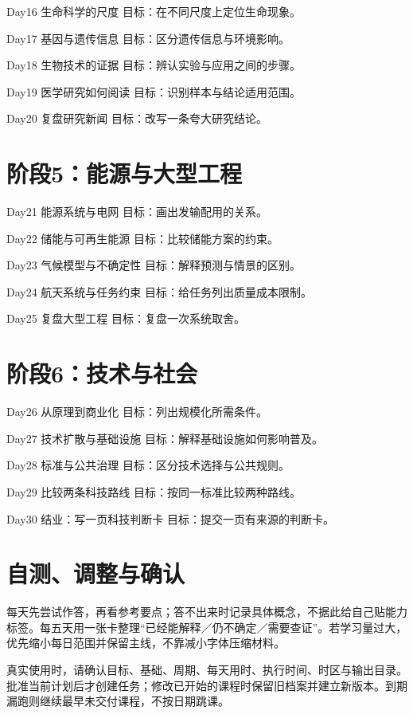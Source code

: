 \documentclass[11pt]{article}
\newcommand{\Needspace}[1]{\par\ifdim\dimexpr\pagegoal-\pagetotal\relax<#1\relax\newpage\fi}
\begin{document}
Day16  生命科学的尺度
目标：在不同尺度上定位生命现象。

Day17  基因与遗传信息
目标：区分遗传信息与环境影响。

Day18  生物技术的证据
目标：辨认实验与应用之间的步骤。

Day19  医学研究如何阅读
目标：识别样本与结论适用范围。

Day20  复盘研究新闻
目标：改写一条夸大研究结论。

\Needspace{5\baselineskip}\section*{阶段5：能源与大型工程}

Day21  能源系统与电网
目标：画出发输配用的关系。

Day22  储能与可再生能源
目标：比较储能方案的约束。

Day23  气候模型与不确定性
目标：解释预测与情景的区别。

Day24  航天系统与任务约束
目标：给任务列出质量成本限制。

Day25  复盘大型工程
目标：复盘一次系统取舍。

\Needspace{5\baselineskip}\section*{阶段6：技术与社会}

Day26  从原理到商业化
目标：列出规模化所需条件。

Day27  技术扩散与基础设施
目标：解释基础设施如何影响普及。

Day28  标准与公共治理
目标：区分技术选择与公共规则。

Day29  比较两条科技路线
目标：按同一标准比较两种路线。

Day30  结业：写一页科技判断卡
目标：提交一页有来源的判断卡。

\Needspace{5\baselineskip}\section*{自测、调整与确认}

每天先尝试作答，再看参考要点；答不出来时记录具体概念，不据此给自己贴能力标签。每五天用一张卡整理“已经能解释／仍不确定／需要查证”。若学习量过大，优先缩小每日范围并保留主线，不靠减小字体压缩材料。

真实使用时，请确认目标、基础、周期、每天用时、执行时间、时区与输出目录。批准当前计划后才创建任务；修改已开始的课程时保留旧档案并建立新版本。到期漏跑则继续最早未交付课程，不按日期跳课。
\end{document}
